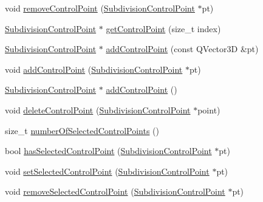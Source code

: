 \begin{DoxyCompactItemize}
void \hyperlink{classShipCADGeometry_1_1SubdivisionSurface_aa20b9227481180329e03de8897c52933}{remove\-Control\-Point} (\hyperlink{classShipCADGeometry_1_1SubdivisionControlPoint}{Subdivision\-Control\-Point} $\ast$pt)
\item 
\hyperlink{classShipCADGeometry_1_1SubdivisionControlPoint}{Subdivision\-Control\-Point} $\ast$ \hyperlink{classShipCADGeometry_1_1SubdivisionSurface_a8aa8d3fdfc5e81ba4a39858a69228652}{get\-Control\-Point} (size\-\_\-t index)
\item 
\hyperlink{classShipCADGeometry_1_1SubdivisionControlPoint}{Subdivision\-Control\-Point} $\ast$ \hyperlink{classShipCADGeometry_1_1SubdivisionSurface_af644edd0d4ba993dbab280f036b37171}{add\-Control\-Point} (const Q\-Vector3\-D \&pt)
\item 
void \hyperlink{classShipCADGeometry_1_1SubdivisionSurface_a7ac8b717bcb728da2334cc2f16c8b428}{add\-Control\-Point} (\hyperlink{classShipCADGeometry_1_1SubdivisionControlPoint}{Subdivision\-Control\-Point} $\ast$pt)
\item 
\hyperlink{classShipCADGeometry_1_1SubdivisionControlPoint}{Subdivision\-Control\-Point} $\ast$ \hyperlink{classShipCADGeometry_1_1SubdivisionSurface_a7eccf33cb39ef12f56553352da34da62}{add\-Control\-Point} ()
\item 
void \hyperlink{classShipCADGeometry_1_1SubdivisionSurface_ad4f874132a137e89a39e60572748dab0}{delete\-Control\-Point} (\hyperlink{classShipCADGeometry_1_1SubdivisionControlPoint}{Subdivision\-Control\-Point} $\ast$point)
\item 
size\-\_\-t \hyperlink{classShipCADGeometry_1_1SubdivisionSurface_aedbc306bdce5691ff96a3a1eeb9aaece}{number\-Of\-Selected\-Control\-Points} ()
\item 
bool \hyperlink{classShipCADGeometry_1_1SubdivisionSurface_aafd696ac2c5353ac5593acdbe8b1fb2e}{has\-Selected\-Control\-Point} (\hyperlink{classShipCADGeometry_1_1SubdivisionControlPoint}{Subdivision\-Control\-Point} $\ast$pt)
\item 
void \hyperlink{classShipCADGeometry_1_1SubdivisionSurface_a65cc43d93da8ed72af631e893057c773}{set\-Selected\-Control\-Point} (\hyperlink{classShipCADGeometry_1_1SubdivisionControlPoint}{Subdivision\-Control\-Point} $\ast$pt)
\item 
void \hyperlink{classShipCADGeometry_1_1SubdivisionSurface_a5be891c06dc5e441511fbdb73d71efeb}{remove\-Selected\-Control\-Point} (\hyperlink{classShipCADGeometry_1_1SubdivisionControlPoint}{Subdivision\-Control\-Point} $\ast$pt)
\item 

\end{DoxyCompactItemize}
